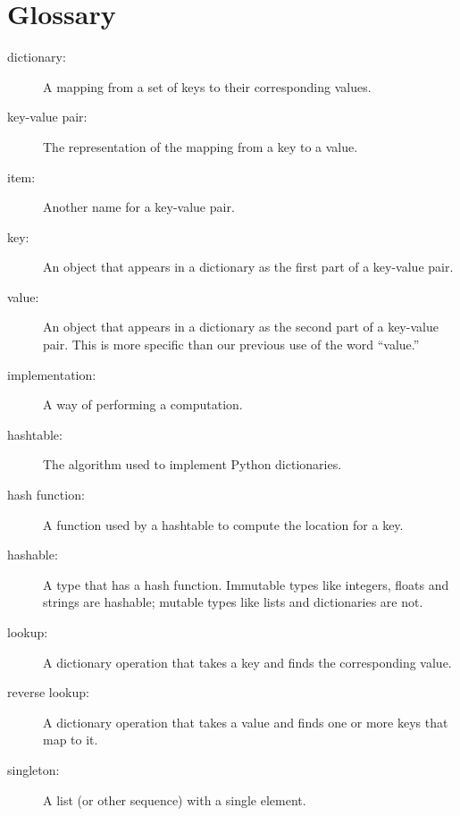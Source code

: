 \documentclass[10pt]{book}
\begin{document}
\section{Glossary}

\begin{description}

\item[dictionary:] A mapping from a set of keys to their
corresponding values.

\item[key-value pair:] The representation of the mapping from
a key to a value.

\item[item:] Another name for a key-value pair.

\item[key:] An object that appears in a dictionary as the
first part of a key-value pair.

\item[value:] An object that appears in a dictionary as the
second part of a key-value pair.  This is more specific than
our previous use of the word ``value.''

\item[implementation:] A way of performing a computation.

\item[hashtable:] The algorithm used to implement Python
dictionaries.

\item[hash function:] A function used by a hashtable to compute the
location for a key.

\item[hashable:] A type that has a hash function.  Immutable
types like integers,
floats and strings are hashable; mutable types like lists and
dictionaries are not.

\item[lookup:] A dictionary operation that takes a key and finds
the corresponding value.

\item[reverse lookup:] A dictionary operation that takes a value and finds
one or more keys that map to it.

\item[singleton:] A list (or other sequence) with a single element.


\end{description}
\end{document}
